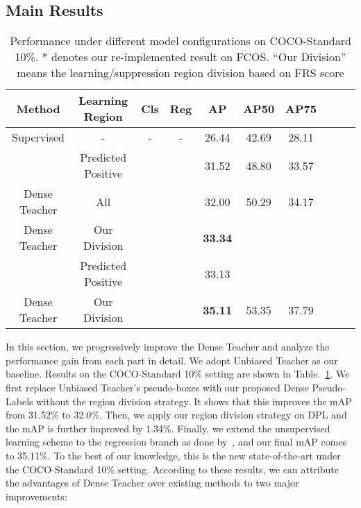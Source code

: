 \documentclass[runningheads]{llncs}
\begin{document}
\subsection{Main Results}
\label{sec:analy}
\begin{table}[t]
	\begin{center}
		\caption{Performance under different model configurations on COCO-Standard 10\%. * denotes our re-implemented result on FCOS. ``Our Division'' means the learning/suppression region division based on FRS score}
		\label{table:1}
		\begin{tabular}{cccccccccc}
			\hline
			Method & Learning Region & Cls          & Reg          & AP                               & AP50       & AP75      \\
			\hline
			Supervised & -
			       & -     & -     & 26.44                            & 42.69      & 28.11         \\
			\hline
			~\cite{ubteacher} & Predicted Positive
			       &  &      & 31.52      & 48.80      & 33.57          \\
			Dense Teacher & All
			       &  &      & 32.00 & 50.29 & 34.17  \\
Dense Teacher& Our Division
			       &  &      & \textbf{33.34} &  &   \\
			\hline
			~\cite{ubteacher}& Predicted Positive
			       &  &  & 33.13        &     &    \\
Dense Teacher& Our Division
			       &  &  & \textbf{35.11} &  53.35  &  37.79    \\
			\hline
		\end{tabular}
	\end{center}
\end{table}




In this section, we progressively improve the Dense Teacher and analyze the performance gain from each part in detail. We adopt Unbiased Teacher as our baseline. Results on the COCO-Standard 10\% setting are shown in Table.~\ref{table:1}. We first replace Unbiased Teacher's pseudo-boxes with our proposed Dense Pseudo-Labels without the region division strategy. It shows that this improves the mAP from 31.52\% to 32.0\%. Then, we apply our region division strategy on DPL and the mAP is further improved by 1.34\%. Finally, we extend the unsupervised learning scheme to the regression branch as done by~\cite{softteacher}, and our final mAP comes to 35.11\%. To the best of our knowledge, this is the new state-of-the-art under the COCO-Standard 10\% setting. According to these results, we can attribute the advantages of Dense Teacher over existing methods to two major improvements:
\end{document}
